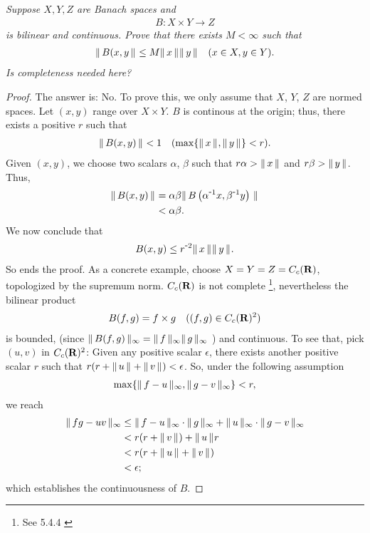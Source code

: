 \textit{
Suppose $X,Y,Z$ are Banach spaces and 
%
  \begin{align*}
    B:X\times Y \to Z
  \end{align*}
is bilinear and continuous. Prove that there exists $M<\infty$ such that 
%
  \begin{align*}
    \| \,B(x, y \, \|_{} \leq M \| \,x \, \|_{}\| \,y \, \|_{} \quad (x\in X, y\in Y).
  \end{align*}
%
Is completeness needed here?}
\begin{proof} The answer is: No. To prove this, we only assume that %
%
  $X$, $Y$, $Z$ %
%
are normed spaces. %
%
Let $(x, y)$ range over $X\times Y$. %
%
$B$ is continous at the origin; thus, there exists a positive $r$ such that %
%
  \begin{align}
    \| \,B(x,y) \, \|_{} < 1 \quad (\max\{\| \,x \, \|_{}, \| \,y \, \|_{}\} < r).
  \end{align}
%
Given $(x, y)$, we choose two scalars  %
%
  $\alpha$, $\beta$ %
%
such that %
%
  $r\alpha > \| \,x \, \|_{} $ and $r\beta >\| \,y \, \|_{}$. %
%
Thus, 
%
  \begin{align}
    \| \,B(x, y) \, \|_{} 
     & = 
    \alpha \beta \| \,
        B\left(
          \alpha^{\text{\small{-}} 1} x, 
          \beta^{\text{\small{-}} 1} y
        \right)
       \, \|_{}\\
    & < \alpha \beta.
  \end{align}
%
We now conclude that %
%
  \begin{align}
      B(x, y)\leq 
    r^{\text{\small{-}} 2} \| \,x \, \|_{}\| \,y \, \|_{}.
  \end{align}
%
So ends the proof. %
%
\newline\newline\noindent %
%
As a concrete example, choose %
%
  $X = Y = Z = C_c({\mathbf R})$, %
%
topologized by the supremum norm. %
%
$C_c({\mathbf R})$ is not complete%
%
  \footnote{
    See 5.4.4 \cite{AnalyseIII} 
  }, %
nevertheless the bilinear product %
%
  \begin{align}
    B(f, g) = f\times g \quad ((f, g)\in C_c(\R)^2) %
  \end{align}
%
is bounded, (since %
    $\| \,B(f,g)  \, \|_{\infty} = \| \,f \, \|_{\infty}\| \,g \, \|_{\infty}$%
) %
and continuous. To see that, pick $(u, v)$ in $C_c({\mathbf R})^2$: %
Given any positive scalar $\epsilon$, %
there exists another positive scalar $r$ such that %
%
  $r(r + \| \,u \, \|_{} + \| \,v \, \|_{}) < \epsilon$. %
%
So, under the following assumption %
%
\begin{align}
  \max\singleton{\norm{\infty}{f-u}, \norm{\infty}{g-v}} < r, %
\end{align}
we reach %
%
  \begin{align}
    \norm{\infty}{fg - uv} %
      & \leq 
    \norm{\infty}{f-u} \cdot \norm{\infty}{g} + 
    \norm{\infty}{u}   \cdot \norm{\infty}{g-v} \\
      & < r ( r + \norm{}{v} )  + \norm{}{u} r \\
      & < r(r + \norm{}{u} + \norm{}{v}) \\
      & < \epsilon; 
  \end{align}
  which establishes the continuousness of $B$. 
  \end{proof}
